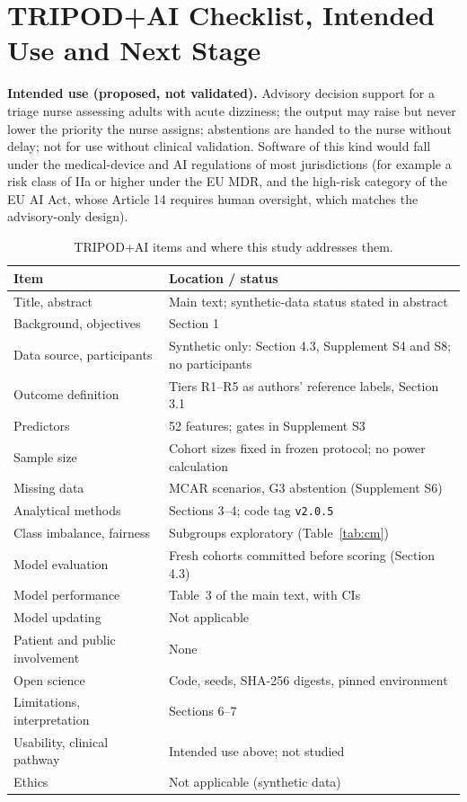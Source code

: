 \documentclass[11pt,a4paper]{article}%
\begin{document}
\section{TRIPOD+AI Checklist, Intended Use and Next Stage}\label{sup:tripod}

\textbf{Intended use (proposed, not validated).} Advisory decision support for a triage nurse assessing adults with acute dizziness; the output may raise but never lower the priority the nurse assigns; abstentions are handed to the nurse without delay; not for use without clinical validation. Software of this kind would fall under the medical-device and AI regulations of most jurisdictions (for example a risk class of IIa or higher under the EU MDR, and the high-risk category of the EU AI Act, whose Article 14 requires human oversight, which matches the advisory-only design).

\begin{table}[h]
\caption{TRIPOD+AI items and where this study addresses them.}\label{tab:tripod}
\footnotesize
\begin{tabular}{@{}p{}p{}@{}}
\toprule
Item & Location / status \\
\midrule
Title, abstract & Main text; synthetic-data status stated in abstract \\
Background, objectives & Section 1 \\
Data source, participants & Synthetic only: Section 4.3, Supplement S4 and S8; no participants \\
Outcome definition & Tiers R1--R5 as authors' reference labels, Section 3.1 \\
Predictors & 52 features; gates in Supplement S3 \\
Sample size & Cohort sizes fixed in frozen protocol; no power calculation \\
Missing data & MCAR scenarios, G3 abstention (Supplement S6) \\
Analytical methods & Sections 3--4; code tag \texttt{v2.0.5} \\
Class imbalance, fairness & Subgroups exploratory (Table~\ref{tab:cm}) \\
Model evaluation & Fresh cohorts committed before scoring (Section 4.3) \\
Model performance & Table~3 of the main text, with CIs \\
Model updating & Not applicable \\
Patient and public involvement & None \\
Open science & Code, seeds, SHA-256 digests, pinned environment \\
Limitations, interpretation & Sections 6--7 \\
Usability, clinical pathway & Intended use above; not studied \\
Ethics & Not applicable (synthetic data) \\
\bottomrule
\end{tabular}
\end{table}
\end{document}

